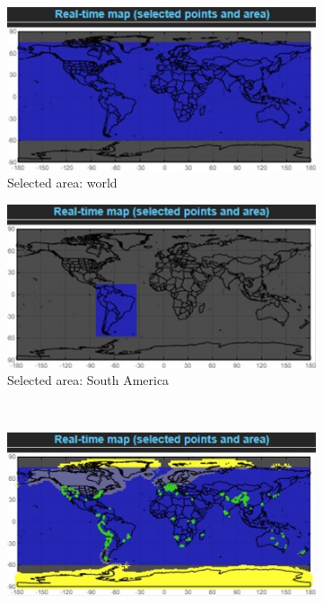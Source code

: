 \documentclass[11pt,a4paper,titlepage]{report}
\begin{document}
\begin{figure}[H]
    \centering
    \begin{subfigure}[H]{0.45\textwidth}
        \includegraphics[width=\textwidth]{RM1.jpg}
        \caption{Selected area: world}
    \end{subfigure}
    \quad
    \begin{subfigure}[H]{0.45\textwidth}
        \includegraphics[width=\textwidth]{RM2.jpg}
        \caption{Selected area: South America}
    \end{subfigure}\\
    \begin{subfigure}[H]{0.45\textwidth}
        \includegraphics[width=\textwidth]{RM3.jpg}

\end{subfigure}
\end{figure}
\end{document}
